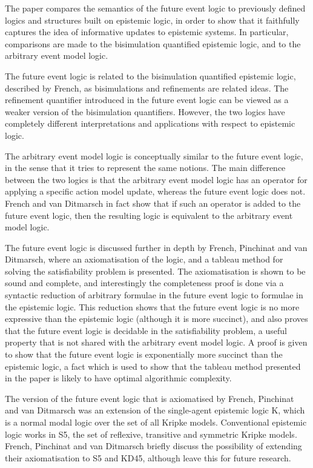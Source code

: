 The paper compares the semantics of the future event logic to previously defined
logics and structures built on epistemic logic, in order to show that it
faithfully captures the idea of informative updates to epistemic systems. In
particular, comparisons are made to the bisimulation quantified epistemic logic,
and to the arbitrary event model logic. 

The future event logic is related to the bisimulation quantified epistemic
logic, described by French\cite{french2006bisimulation}, as bisimulations and
refinements are related ideas. The refinement quantifier introduced in the
future event logic can be viewed as a weaker version of the bisimulation
quantifiers. However, the two logics have completely different interpretations
and applications with respect to epistemic logic.

The arbitrary event model logic is conceptually similar to the future event
logic, in the sense that it tries to represent the same notions. The main
difference between the two logics is that the arbitrary event model logic has an
operator for applying a specific action model update, whereas the future event
logic does not. French and van Ditmarsch\cite{french2009simulation} in fact show
that if such an operator is added to the future event logic, then the resulting
logic is equivalent to the arbitrary event model logic.

The future event logic is discussed further in depth by French, Pinchinat and
van Ditmarsch\cite{french2010future}, where an axiomatisation of the logic, and
a tableau method for solving the satisfiability problem is presented. The
axiomatisation is shown to be sound and complete, and interestingly the
completeness proof is done via a syntactic reduction of arbitrary formulae in
the future event logic to formulae in the epistemic logic. This reduction shows
that the future event logic is no more expressive than the epistemic logic
(although it is more succinct), and also proves that the future event logic is
decidable in the satisfiability problem, a useful property that is not shared
with the arbitrary event model logic. A proof is given to show that the future
event logic is exponentially more succinct than the epistemic logic, a fact
which is used to show that the tableau method presented in the paper is likely
to have optimal algorithmic complexity.

The version of the future event logic that is axiomatised by French, Pinchinat
and van Ditmarsch\cite{french2010future} was an extension of the single-agent
epistemic logic K, which is a normal modal logic over the set of all Kripke
models. Conventional epistemic logic works in S5, the set of reflexive,
transitive and symmetric Kripke models. French, Pinchinat and van Ditmarsch
briefly discuss the possibility of extending their axiomatisation to S5 and
KD45, although leave this for future research.

